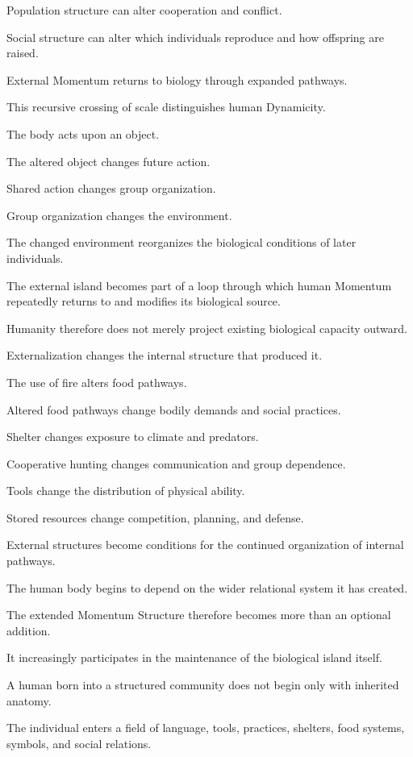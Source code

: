 Population structure can alter cooperation and conflict.

Social structure can alter which individuals reproduce and how offspring are raised.

External Momentum returns to biology through expanded pathways.

This recursive crossing of scale distinguishes human Dynamicity.

The body acts upon an object.

The altered object changes future action.

Shared action changes group organization.

Group organization changes the environment.

The changed environment reorganizes the biological conditions of later individuals.

The external island becomes part of a loop through which human Momentum repeatedly returns to and modifies its biological source.

Humanity therefore does not merely project existing biological capacity outward.

Externalization changes the internal structure that produced it.

The use of fire alters food pathways.

Altered food pathways change bodily demands and social practices.

Shelter changes exposure to climate and predators.

Cooperative hunting changes communication and group dependence.

Tools change the distribution of physical ability.

Stored resources change competition, planning, and defense.

External structures become conditions for the continued organization of internal pathways.

The human body begins to depend on the wider relational system it has created.

The extended Momentum Structure therefore becomes more than an optional addition.

It increasingly participates in the maintenance of the biological island itself.

A human born into a structured community does not begin only with inherited anatomy.

The individual enters a field of language, tools, practices, shelters, food systems, symbols, and social relations.


